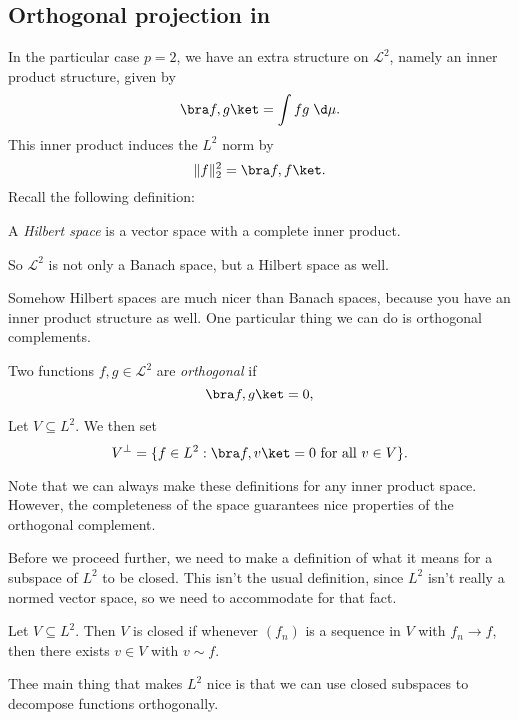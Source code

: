 \documentclass[a4paper]{article}
\begin{document}
\subsection{Orthogonal projection in }
In the particular case $p = 2$, we have an extra structure on $\mathcal{L}^2$, namely an inner product structure, given by
\[
  \bra f, g\ket = \int fg\;\d \mu.
\]
This inner product induces the $L^2$ norm by
\[
  \|f\|_2^2 = \bra f, f\ket.
\]
Recall the following definition:
\begin{defi}
  A \emph{Hilbert space} is a vector space with a complete inner product.
\end{defi}
So $\mathcal{L}^2$ is not only a Banach space, but a Hilbert space as well.

Somehow Hilbert spaces are much nicer than Banach spaces, because you have an inner product structure as well. One particular thing we can do is orthogonal complements.

\begin{defi}
  Two functions $f, g \in \mathcal{L}^2$ are \emph{orthogonal} if
  \[
    \bra f, g\ket = 0,
  \]
\end{defi}

\begin{defi}
  Let $V \subseteq L^2$. We then set
  \[
    V^\perp = \{f \in L^2: \bra f, v \ket = 0\text{ for all }v \in V\}.
  \]
\end{defi}

Note that we can always make these definitions for any inner product space. However, the completeness of the space guarantees nice properties of the orthogonal complement.

Before we proceed further, we need to make a definition of what it means for a subspace of $L^2$ to be closed. This isn't the usual definition, since $L^2$ isn't really a normed vector space, so we need to accommodate for that fact.

\begin{defi}
  Let $V \subseteq L^2$. Then $V$ is closed if whenever $(f_n)$ is a sequence in $V$ with $f_n \to f$, then there exists $v \in V$ with $v \sim f$.
\end{defi}

Thee main thing that makes $L^2$ nice is that we can use closed subspaces to decompose functions orthogonally.
\end{document}
